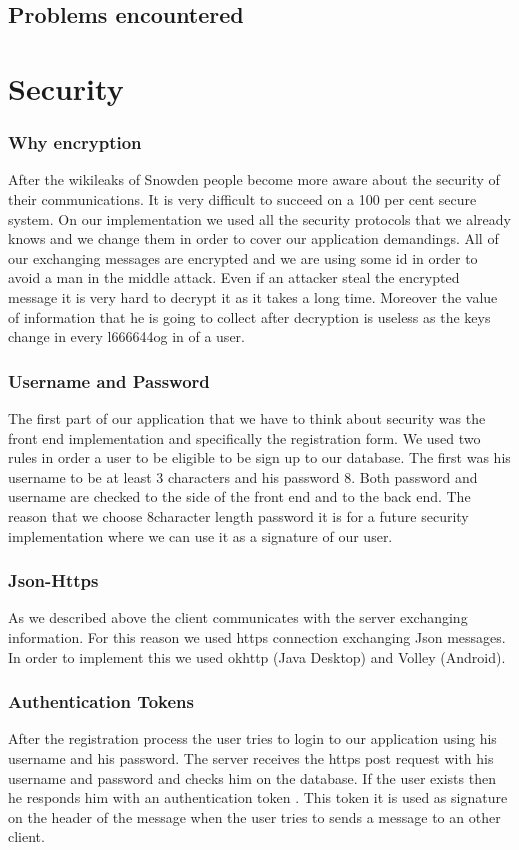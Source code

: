 \documentclass[11pt,a4paper]{report}
\begin{document}
\subsection{Problems encountered}



\section{Security}
\subsubsection{Why encryption}
After the wikileaks of Snowden people become more aware about the security of their communications. It is very difficult to succeed on a 100 per cent secure system. On our implementation we used all the security protocols that we already knows and we change them in order to cover our application demandings. All of our exchanging messages are encrypted and we are using some id in order to avoid a man in the middle attack. Even if an attacker steal the encrypted message it is very hard to decrypt it as it takes a long time. Moreover the value of information that he is going to collect after decryption is useless as the keys change in every l666644og in of a user.
\subsubsection{Username and Password}
The first part of our application that we have to think about security was the front end implementation and specifically the registration form. We used two rules in order a user to be eligible to be sign up to our database. The first was his username to be at least 3 characters and his password 8. Both password and username are checked to the side of the front end and to the back end. The reason that we choose 8character length password it is for a future security implementation where we can use it as a signature of our user.
\subsubsection{Json-Https}
As we described above the client communicates with the server exchanging information. For this reason we used https connection exchanging Json messages. In order to implement this we used okhttp (Java Desktop) and Volley (Android).
\subsubsection{Authentication Tokens}
After the registration process the user tries to login to our application using his username and his password. The server receives the https post request with his username and password and checks him on the database. If the user exists then he responds him with an authentication token .  This token it is used as signature on the header of the message when the user tries to sends a message to an other client.
\end{document}
